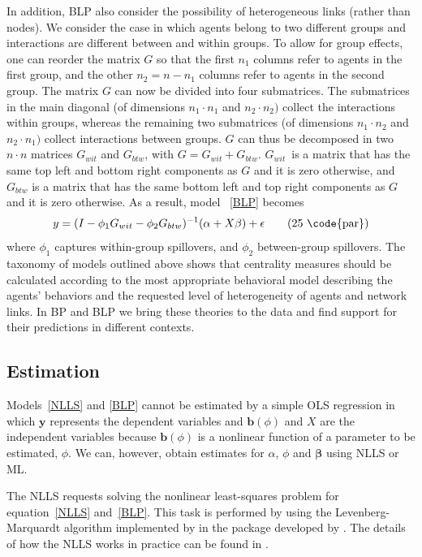 \documentclass[nojss]{jss}
\begin{document}
In addition, BLP also consider the possibility of heterogeneous links (rather than nodes). We consider the case in which agents belong to two different groups and interactions are different between and within groups. To allow for group effects, one can reorder the matrix $G$ so that the first $n_{1}$ columns refer to agents in the first group, and the other $n_{2}=n-n_{1}$ columns refer to agents in the second group. The matrix $G$ can now be divided into four submatrices. The submatrices in the main diagonal (of dimensions $n_{1}\cdot n_{1}$ and $n_{2}\cdot n_{2})$ collect the interactions within groups, whereas the remaining two submatrices (of dimensions $n_{1}\cdot n_{2}$ and $n_{2}\cdot n_{1})$ collect interactions
between groups. $G$ can thus be decomposed in two $n\cdot n$ matrices $G_{wit}$ and $G_{btw}$, with $G=G_{wit}+G_{btw}$. $G_{wit}$\ is a matrix that has the same top left and bottom right components as $G$ and it is zero otherwise, and $G_{btw}$ is a matrix that has the same bottom left and top right components as $G$ and it is zero otherwise. As a result, model ~\ref{BLP} becomes
\begin{equation}
y=(I-\phi _{1}G_{wit}-\phi _{2}G_{btw})^{-1}(\alpha +X\mathbf{\beta })+ \mathbf{\epsilon } \tag{25 \code{par}}  \label{BLP_4}
\end{equation}
\setcounter{equation}{25/}
where $\phi _{1}$ captures within-group spillovers, and $\phi _{2}$ between-group spillovers.
The taxonomy of models outlined above shows that centrality measures should be calculated according to the most appropriate behavioral model describing the agents' behaviors and the requested level of heterogeneity of agents and network links. In BP and BLP we bring these theories to the data and find support for their predictions in different contexts.

\subsection{Estimation} \label{sec:estimation}

Models~\ref{NLLS} and \ref{BLP} cannot be estimated by a simple OLS regression in which $\mathbf{y}$ represents the dependent variables and $\mathbf{b}(\phi)$ and $X$ are the independent variables because $\mathbf{b}(\phi)$ is a nonlinear function of a parameter to be estimated, $\phi $. We can, however, obtain estimates for $\alpha $, $\phi$ and $\mathbf{\beta}$ using NLLS or ML.

The NLLS requests solving the nonlinear least-squares problem for equation~\ref{NLLS} and~\ref{BLP}. This task is performed by  using the Levenberg-Marquardt algorithm implemented by \cite{Box:1969} in the  package  developed by \cite{minpack.lm}. The details of how the NLLS works in practice can be found in \cite{More:1978}.
\end{document}

